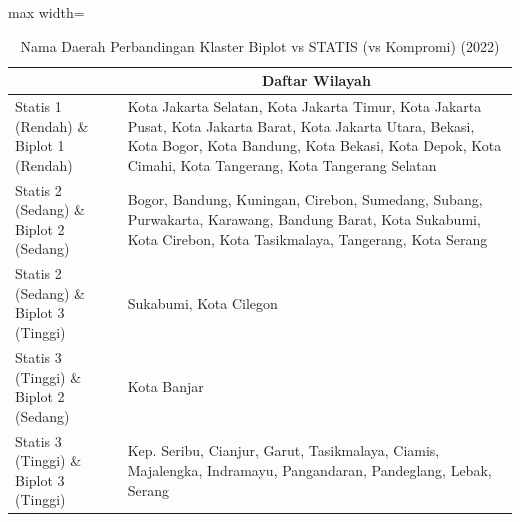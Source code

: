 \begin{table}[H]
\centering
\caption{Nama Daerah Perbandingan Klaster Biplot vs STATIS (vs Kompromi) (2022)} \label{tab:app2biplot_statis_name_2022}
\begin{adjustbox}{max width=\textwidth}
\begin{tabular}{|>{\centering\arraybackslash}p{4cm}|p{10cm}|}
\hline
\multicolumn{1}{|c|}{\textbf{Kategori}} & \multicolumn{1}{c|}{\textbf{Daftar Wilayah}} \\
\hline
Statis 1 (Rendah) \& Biplot 1 (Rendah) & Kota Jakarta Selatan, Kota Jakarta Timur, Kota Jakarta Pusat, Kota Jakarta Barat, Kota Jakarta Utara, Bekasi, Kota Bogor, Kota Bandung, Kota Bekasi, Kota Depok, Kota Cimahi, Kota Tangerang, Kota Tangerang Selatan \\
\hline
Statis 2 (Sedang) \& Biplot 2 (Sedang) & Bogor, Bandung, Kuningan, Cirebon, Sumedang, Subang, Purwakarta, Karawang, Bandung Barat, Kota Sukabumi, Kota Cirebon, Kota Tasikmalaya, Tangerang, Kota Serang \\
\hline
Statis 2 (Sedang) \& Biplot 3 (Tinggi) & Sukabumi, Kota Cilegon \\
\hline
Statis 3 (Tinggi) \& Biplot 2 (Sedang) & Kota Banjar \\
\hline
Statis 3 (Tinggi) \& Biplot 3 (Tinggi) & Kep. Seribu, Cianjur, Garut, Tasikmalaya, Ciamis, Majalengka, Indramayu, Pangandaran, Pandeglang, Lebak, Serang \\
\hline
\end{tabular}
\end{adjustbox}
\end{table}